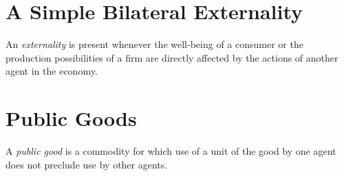 \addtocounter{section}{1}

\section{A Simple Bilateral Externality}

\begin{defn}
    An \emph{externality} is present whenever the well-being of a consumer or the production possibilities of a firm are directly affected by the actions of another agent in the economy.
\end{defn}


\section{Public Goods}

\begin{defn}
    A \emph{public good} is a commodity for which use of a unit of the good by one agent does not preclude use by other agents.
\end{defn}
